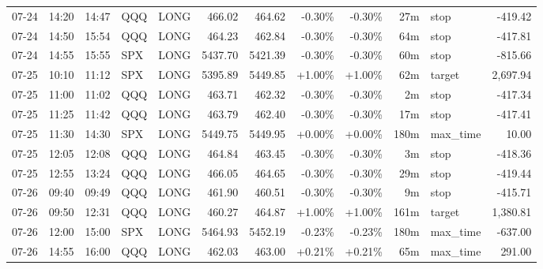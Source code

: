 \documentclass[11pt,a4paper]{article}
\begin{document}
\begin{center}
\begin{longtable}{>{\color{txtmain}}l l l l l r r r r r >{\color{txtmain}}l r}
07-24 & 14:20 & 14:47 & QQQ & LONG & 466.02 & 464.62 & \textcolor{lossred}{-0.30\%} & \textcolor{lossred}{-0.30\%} & 27m & stop & \textcolor{lossred}{-419.42} \\
07-24 & 14:50 & 15:54 & QQQ & LONG & 464.23 & 462.84 & \textcolor{lossred}{-0.30\%} & \textcolor{lossred}{-0.30\%} & 64m & stop & \textcolor{lossred}{-417.81} \\
07-24 & 14:55 & 15:55 & SPX & LONG & 5437.70 & 5421.39 & \textcolor{lossred}{-0.30\%} & \textcolor{lossred}{-0.30\%} & 60m & stop & \textcolor{lossred}{-815.66} \\
07-25 & 10:10 & 11:12 & SPX & LONG & 5395.89 & 5449.85 & \textcolor{wingreen}{+1.00\%} & \textcolor{wingreen}{+1.00\%} & 62m & target & \textcolor{wingreen}{2,697.94} \\
07-25 & 11:00 & 11:02 & QQQ & LONG & 463.71 & 462.32 & \textcolor{lossred}{-0.30\%} & \textcolor{lossred}{-0.30\%} & 2m & stop & \textcolor{lossred}{-417.34} \\
07-25 & 11:25 & 11:42 & QQQ & LONG & 463.79 & 462.40 & \textcolor{lossred}{-0.30\%} & \textcolor{lossred}{-0.30\%} & 17m & stop & \textcolor{lossred}{-417.41} \\
07-25 & 11:30 & 14:30 & SPX & LONG & 5449.75 & 5449.95 & \textcolor{wingreen}{+0.00\%} & \textcolor{wingreen}{+0.00\%} & 180m & max\_time & \textcolor{wingreen}{10.00} \\
07-25 & 12:05 & 12:08 & QQQ & LONG & 464.84 & 463.45 & \textcolor{lossred}{-0.30\%} & \textcolor{lossred}{-0.30\%} & 3m & stop & \textcolor{lossred}{-418.36} \\
07-25 & 12:55 & 13:24 & QQQ & LONG & 466.05 & 464.65 & \textcolor{lossred}{-0.30\%} & \textcolor{lossred}{-0.30\%} & 29m & stop & \textcolor{lossred}{-419.44} \\
07-26 & 09:40 & 09:49 & QQQ & LONG & 461.90 & 460.51 & \textcolor{lossred}{-0.30\%} & \textcolor{lossred}{-0.30\%} & 9m & stop & \textcolor{lossred}{-415.71} \\
07-26 & 09:50 & 12:31 & QQQ & LONG & 460.27 & 464.87 & \textcolor{wingreen}{+1.00\%} & \textcolor{wingreen}{+1.00\%} & 161m & target & \textcolor{wingreen}{1,380.81} \\
07-26 & 12:00 & 15:00 & SPX & LONG & 5464.93 & 5452.19 & \textcolor{lossred}{-0.23\%} & \textcolor{lossred}{-0.23\%} & 180m & max\_time & \textcolor{lossred}{-637.00} \\
07-26 & 14:55 & 16:00 & QQQ & LONG & 462.03 & 463.00 & \textcolor{wingreen}{+0.21\%} & \textcolor{wingreen}{+0.21\%} & 65m & max\_time & \textcolor{wingreen}{291.00} \\

\end{longtable}
\end{center}
\end{document}
